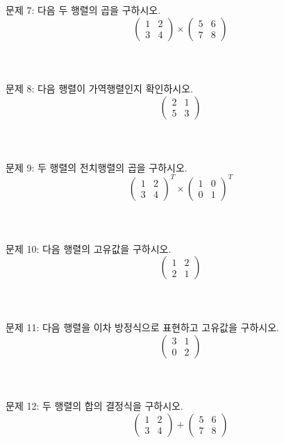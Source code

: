 \documentclass[fleqn]{article}
\begin{document}
\noindent 문제 7: 다음 두 행렬의 곱을 구하시오.
\[
\begin{pmatrix} 1 & 2 \\ 3 & 4 \end{pmatrix} \times \begin{pmatrix} 5 & 6 \\ 7 & 8 \end{pmatrix}
\]
\\\\\\

\noindent 문제 8: 다음 행렬이 가역행렬인지 확인하시오.
\[
\begin{pmatrix} 2 & 1 \\ 5 & 3 \end{pmatrix}
\]
\\\\\\

\noindent 문제 9: 두 행렬의 전치행렬의 곱을 구하시오.
\[
\begin{pmatrix} 1 & 2 \\ 3 & 4 \end{pmatrix}^T \times \begin{pmatrix} 1 & 0 \\ 0 & 1 \end{pmatrix}^T
\]
\\\\\\

\noindent 문제 10: 다음 행렬의 고유값을 구하시오.
\[
\begin{pmatrix} 1 & 2 \\ 2 & 1 \end{pmatrix}
\]
\\\\\\

\noindent 문제 11: 다음 행렬을 이차 방정식으로 표현하고 고유값을 구하시오.
\[
\begin{pmatrix} 3 & 1 \\ 0 & 2 \end{pmatrix}
\]
\\\\\\

\noindent 문제 12: 두 행렬의 합의 결정식을 구하시오.
\[
\begin{pmatrix} 1 & 2 \\ 3 & 4 \end{pmatrix} + \begin{pmatrix} 5 & 6 \\ 7 & 8 \end{pmatrix}
\]
\\\\\\
\end{document}
